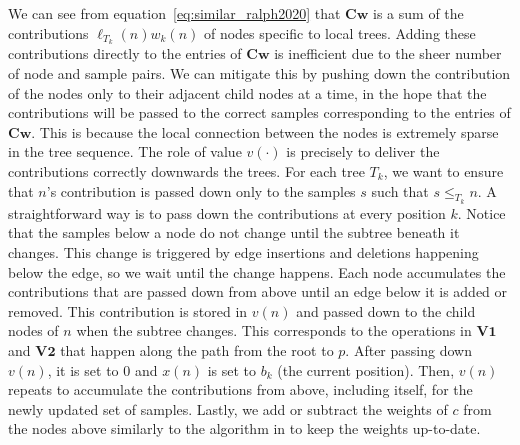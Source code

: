 We can see from equation~\eqref{eq:similar_ralph2020} that $\mathbf{C}\mathbf{w}$ is
a sum of the contributions $\ell_{T_k}(n)w_k(n)$ of nodes specific to local trees.
Adding these contributions directly to the entries of $\mathbf{C}\mathbf{w}$ is
inefficient due to the sheer number of node and sample pairs.
We can mitigate this by pushing down the contribution of the nodes only to their adjacent child nodes at a time,
in the hope that the contributions will be passed to the correct samples corresponding to the entries of $\mathbf{C}\mathbf{w}$.
This is because the local connection between the nodes is extremely sparse in the tree sequence.
The role of value $v(\cdot)$ is precisely to deliver the contributions correctly downwards the trees.
For each tree $T_k$, we want to ensure that $n$'s contribution is passed down only to
the samples $s$ such that $s \le_{T_k} n$.
A straightforward way is to pass down the contributions at every position $k$.
Notice that the samples below a node do not change until the subtree beneath it changes.
This change is triggered by edge insertions and deletions happening below the edge,
so we wait until the change happens.
Each node accumulates the contributions that are passed down from above
until an edge below it is added or removed.
This contribution is stored in $v(n)$ and passed down to the child nodes of $n$ when the subtree changes.
This corresponds to the operations in $\mathbf{V1}$ and $\mathbf{V2}$
that happen along the path from the root to $p$.
After passing down $v(n)$, it is set to $0$ and $x(n)$ is set to $b_k$ (the current position).
Then, $v(n)$ repeats to accumulate the contributions from above, including itself,
for the newly updated set of samples.
Lastly, we add or subtract the weights of $c$ from the nodes above similarly to
the algorithm in \citet{ralph2020efficiently} to keep the weights up-to-date.



